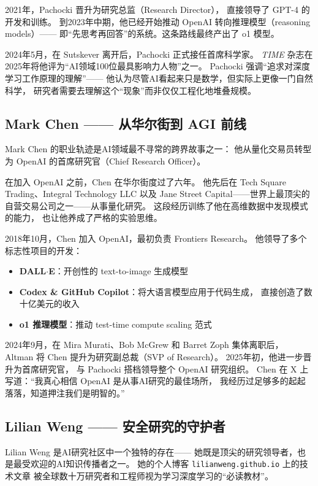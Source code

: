 2021年，Pachocki 晋升为研究总监（Research Director），
直接领导了 GPT-4 的开发和训练。
到2023年中期，他已经开始推动 OpenAI 转向推理模型（reasoning models）——
即``先思考再回答''的系统。这条路线最终产出了 o1 模型。

2024年5月，在 Sutskever 离开后，Pachocki 正式接任首席科学家。
\emph{TIME} 杂志在2025年将他评为``AI领域100位最具影响力人物''之一。
Pachocki 强调``追求对深度学习工作原理的理解''——
他认为尽管AI看起来只是数学，但实际上更像一门自然科学，
研究者需要去理解这个``现象''而非仅仅工程化地堆叠规模。


\subsection{Mark Chen —— 从华尔街到 AGI 前线}
\label{subsec:mark-chen}

Mark Chen 的职业轨迹是AI领域最不寻常的跨界故事之一：
他从量化交易员转型为 OpenAI 的首席研究官（Chief Research Officer）。

在加入 OpenAI 之前，Chen 在华尔街度过了六年。
他先后在 Tech Square Trading、Integral Technology LLC 以及
Jane Street Capital——世界上最顶尖的自营交易公司之一——从事量化研究。
这段经历训练了他在高维数据中发现模式的能力，
也让他养成了严格的实验思维。

2018年10月，Chen 加入 OpenAI，最初负责 Frontiers Research。
他领导了多个标志性项目的开发：
\begin{itemize}[noitemsep]
  \item \textbf{DALL$\cdot$E}：开创性的 text-to-image 生成模型
  \item \textbf{Codex \& GitHub Copilot}：将大语言模型应用于代码生成，
        直接创造了数十亿美元的收入
  \item \textbf{o1 推理模型}：推动 test-time compute scaling 范式
\end{itemize}

2024年9月，在 Mira Murati、Bob McGrew 和 Barret Zoph 集体离职后，
Altman 将 Chen 提升为研究副总裁（SVP of Research）。
2025年初，他进一步晋升为首席研究官，
与 Pachocki 搭档领导整个 OpenAI 研究组织。
Chen 在 X 上写道：``我真心相信 OpenAI 是从事AI研究的最佳场所，
我经历过足够多的起起落落，知道押注我们是明智的。''


\subsection{Lilian Weng —— 安全研究的守护者}
\label{subsec:lilian-weng}

Lilian Weng 是AI研究社区中一个独特的存在——
她既是顶尖的研究领导者，也是最受欢迎的AI知识传播者之一。
她的个人博客 \texttt{lilianweng.github.io} 上的技术文章
被全球数十万研究者和工程师视为学习深度学习的``必读教材''。

